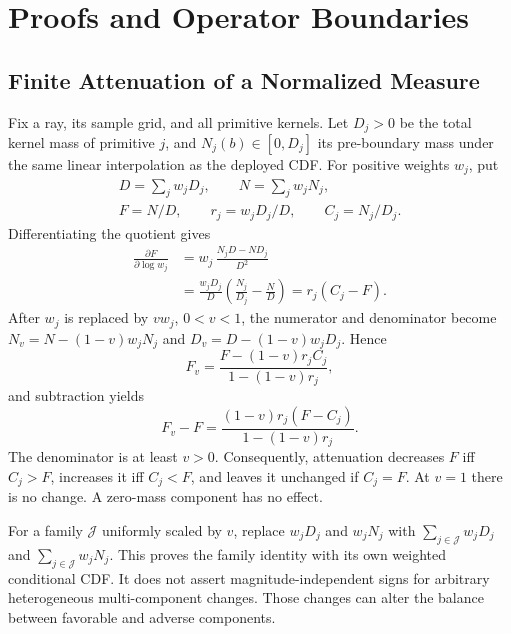 \section{Proofs and Operator Boundaries}
\label{sec:archive-proofs}

\subsection{Finite Attenuation of a Normalized Measure}

Fix a ray, its sample grid, and all primitive kernels.
Let $D_j>0$ be the total kernel mass of primitive $j$, and $N_j(b)\in[0,D_j]$ its
pre-boundary mass under the same linear interpolation as the deployed CDF.
For positive weights $w_j$, put
\begin{equation}
\begin{gathered}
D=\sum_jw_jD_j,\qquad N=\sum_jw_jN_j,\\
F=N/D,\qquad r_j=w_jD_j/D,\qquad C_j=N_j/D_j.
\end{gathered}
\end{equation}
Differentiating the quotient gives
\begin{equation}
\begin{aligned}
\frac{\partial F}{\partial\log w_j}
&=w_j\,\frac{N_jD-ND_j}{D^2}\\
&=\frac{w_jD_j}{D}\left(\frac{N_j}{D_j}-\frac ND\right)
=r_j(C_j-F).
\end{aligned}
\end{equation}
After $w_j$ is replaced by $vw_j$, $0<v<1$, the numerator and denominator become
$N_v=N-(1-v)w_jN_j$ and $D_v=D-(1-v)w_jD_j$.
Hence
\begin{equation}
F_v=\frac{F-(1-v)r_jC_j}{1-(1-v)r_j},
\end{equation}
and subtraction yields
\begin{equation}
F_v-F=\frac{(1-v)r_j(F-C_j)}{1-(1-v)r_j}.
\label{eq:archive-finite}
\end{equation}
The denominator is at least $v>0$.
Consequently, attenuation decreases $F$ iff $C_j>F$, increases it iff $C_j<F$,
and leaves it unchanged if $C_j=F$. At $v=1$ there is no change.
A zero-mass component has no effect.

For a family $\mathcal J$ uniformly scaled by $v$, replace $w_jD_j$ and $w_jN_j$ with
$\sum_{j\in\mathcal J}w_jD_j$ and $\sum_{j\in\mathcal J}w_jN_j$.
This proves the family identity with its own weighted conditional CDF.
It does not assert magnitude-independent signs for arbitrary heterogeneous multi-component changes.
Those changes can alter the balance between favorable and adverse components.

